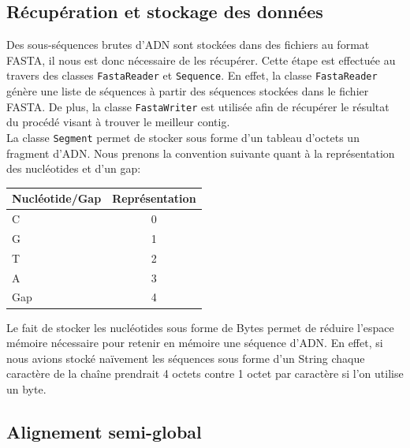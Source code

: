 \subsection{Récupération et stockage des données}
\label{subsection:recStock}

Des sous-séquences brutes d'ADN sont stockées dans des fichiers au format FASTA, il nous est donc nécessaire de les récupérer. Cette étape est effectuée au travers des classes \verb|FastaReader| et \verb|Sequence|. En effet, la classe \verb|FastaReader| génère une liste de séquences à partir des séquences stockées dans le fichier FASTA. De plus, la classe \verb|FastaWriter| est utilisée afin de récupérer le résultat du procédé visant à trouver le meilleur contig.
\\

La classe \verb|Segment| permet de stocker sous forme d'un tableau d'octets un fragment d'ADN. Nous prenons la convention suivante quant à la représentation des nucléotides et d'un gap:
	\begin{center}
		\begin{tabular}{|l|c|}
			\hline
			Nucléotide/Gap & Représentation \\
			\hline
			\hline
			C & 0 \\
			\hline
			G & 1\\
			\hline
			T &  2 \\
			\hline
			A &  3 \\
			\hline
			Gap & 4 \\
			\hline

		\end{tabular}
	\end{center}

	Le fait de stocker les nucléotides sous forme de Bytes permet de réduire
	l'espace mémoire nécessaire pour retenir en mémoire une séquence d'ADN. En
	effet, si nous avions stocké naïvement les séquences sous forme d'un String
	chaque caractère de la chaîne prendrait 4 octets contre 1 octet par
	caractère si l'on utilise un byte.

\subsection{Alignement semi-global}
\label{subsection:semiGlobal}

